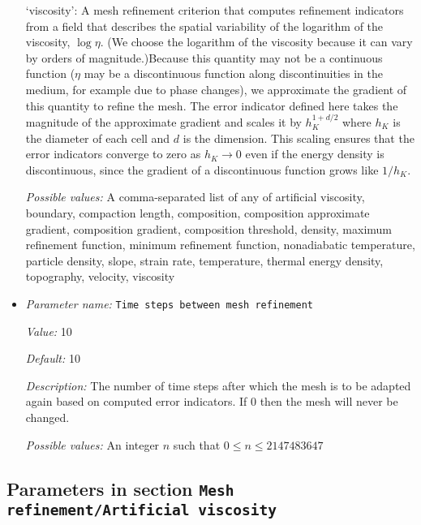 \begin{itemize}
`viscosity': A mesh refinement criterion that computes refinement indicators from a field that describes the spatial variability of the logarithm of the viscosity, $\log\eta$. (We choose the logarithm of the viscosity because it can vary by orders of magnitude.)Because this quantity may not be a continuous function ($\eta$ may be a discontinuous function along discontinuities in the medium, for example due to phase changes), we approximate the gradient of this quantity to refine the mesh. The error indicator defined here takes the magnitude of the approximate gradient and scales it by $h_K^{1+d/2}$ where $h_K$ is the diameter of each cell and $d$ is the dimension. This scaling ensures that the error indicators converge to zero as $h_K\rightarrow 0$ even if the energy density is discontinuous, since the gradient of a discontinuous function grows like $1/h_K$.


{\it Possible values:} A comma-separated list of any of artificial viscosity, boundary, compaction length, composition, composition approximate gradient, composition gradient, composition threshold, density, maximum refinement function, minimum refinement function, nonadiabatic temperature, particle density, slope, strain rate, temperature, thermal energy density, topography, velocity, viscosity
\item {\it Parameter name:} {\tt Time steps between mesh refinement}
\label{parameters:Mesh refinement/Time steps between mesh refinement}


{\it Value:} 10


{\it Default:} 10


{\it Description:} The number of time steps after which the mesh is to be adapted again based on computed error indicators. If 0 then the mesh will never be changed.


{\it Possible values:} An integer $n$ such that $0\leq n \leq 2147483647$
\end{itemize}



\subsection{Parameters in section \tt Mesh refinement/Artificial viscosity}
\label{parameters:Mesh_20refinement/Artificial_20viscosity}

